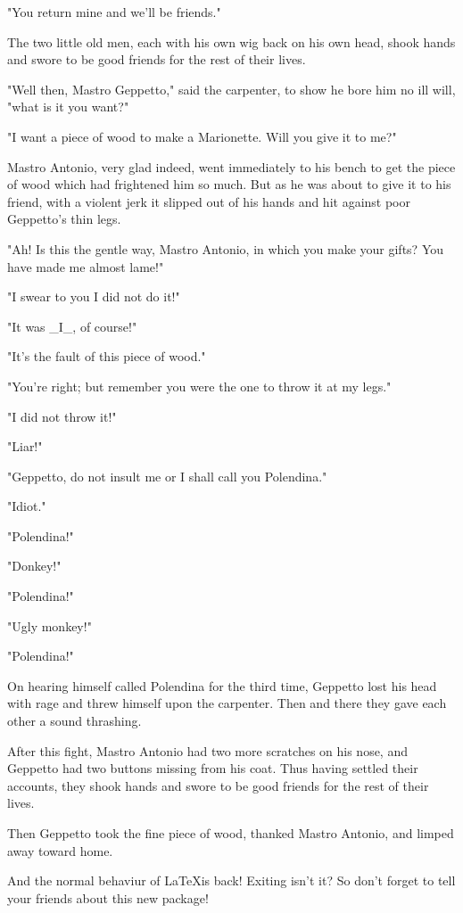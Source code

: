 \documentclass[12pt,twoside,twocolumn]{article}
\begin{document}
{  "You return mine and we'll be friends."

  The two little old men, each with his own wig back on
  his own head, shook hands and swore to be good friends
  for the rest of their lives.

  "Well then, Mastro Geppetto," said the carpenter, to
  show he bore him no ill will, "what is it you want?"

  "I want a piece of wood to make a Marionette.  Will you give it to
  me?"

  Mastro Antonio, very glad indeed, went immediately
  to his bench to get the piece of wood which had frightened
  him so much.  But as he was about to give it to his friend,
  with a violent jerk it slipped out of his hands and hit
  against poor Geppetto's thin legs.

  "Ah!  Is this the gentle way, Mastro Antonio, in which
  you make your gifts?  You have made me almost lame!"

  "I swear to you I did not do it!"

  "It was \_I\_, of course!"

  "It's the fault of this piece of wood."

  "You're right; but remember you were the one to throw it at my legs."

  "I did not throw it!"

  "Liar!"

  "Geppetto, do not insult me or I shall call you Polendina."

  "Idiot."

  "Polendina!"

  "Donkey!"

  "Polendina!"

  "Ugly monkey!"

  "Polendina!"

  On hearing himself called Polendina for the third time,
  Geppetto lost his head with rage and threw himself upon
  the carpenter.  Then and there they gave each other a
  sound thrashing.

  After this fight, Mastro Antonio had two more scratches
  on his nose, and Geppetto had two buttons missing from
  his coat.  Thus having settled their accounts, they shook
  hands and swore to be good friends for the rest of their lives.

  Then Geppetto took the fine piece of wood,
  thanked Mastro Antonio, and limped away toward home.
}
\endrotboxpages

And the normal behaviur of \LaTeX is back!
Exiting isn't it? So don't forget to tell your friends about this new
package!
\end{document}
